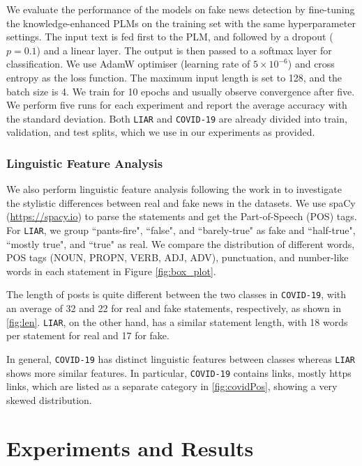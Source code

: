 \documentclass[letterpaper]{article} %
\begin{document}
We evaluate the performance of the models on fake news detection by fine-tuning the knowledge-enhanced PLMs on the training set with the same hyperparameter settings.
The input text is fed first to the PLM, and followed by a dropout ($p=0.1$) and a linear layer. The output is then passed to a softmax layer for classification.
We use AdamW optimiser
\cite{Loshchilov_Hutter_2019_Decoupled} (learning rate of $5\times10^{-6}$) and cross entropy as the loss function.
The maximum input length is set to 128, and the batch size is 4. 
We train for 10 epochs and usually observe convergence after five.
We perform five runs for each experiment and report the average accuracy with the standard deviation.  
Both \texttt{LIAR} and \texttt{COVID-19} are already divided into train, validation, and test splits, which we use in our experiments as provided.


\subsubsection{Linguistic Feature Analysis}
We also perform linguistic feature analysis following the work in 
\citet{Horne_Adali_2017} to investigate the stylistic differences between real and fake news in the datasets.
We use spaCy (\url{https://spacy.io}) to parse the statements and get the Part-of-Speech (POS) tags. 
For \texttt{LIAR}, we group ``pants-fire", ``false", and ``barely-true" as fake and ``half-true", ``mostly true", and ``true" as real. 
We compare the distribution of different words, POS tags (NOUN, PROPN, VERB, ADJ, ADV), punctuation, and number-like words in each statement in Figure \ref{fig:box_plot}.

The length of posts is quite different between the two classes in \texttt{COVID-19}, with an average of 32 and 22 for real and fake statements, respectively, as shown in  
\autoref{fig:len}. 
\texttt{LIAR}, on the other hand, has a similar statement length, with 18 words per statement for real and 17 for fake.

In general, \texttt{COVID-19} has distinct linguistic features between classes whereas \texttt{LIAR} shows more similar features. 
In particular, \texttt{COVID-19} contains links, mostly https links, which are listed as a separate category in \autoref{fig:covidPos}, showing a very skewed distribution. 


\section{Experiments and Results}
\end{document}
